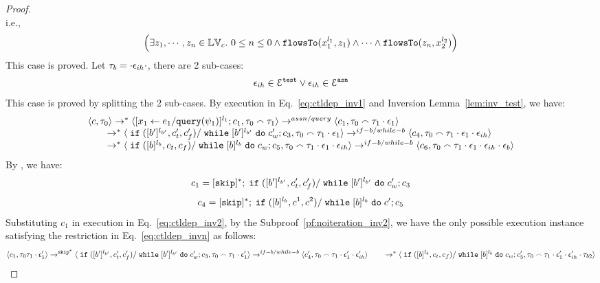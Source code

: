 \begin{proof}
\[ \]
 i.e.,
 \[
 \Big( \exists z_1, \cdots, z_n \in \mathbb{LV}_{{c}}. ~ 0 \leq n \leq 0 \land
  \mathtt{flowsTo}(x_1^{l_1}, z_1) 
  \land \cdots \land \mathtt{flowsTo}(z_n, x_2^{l_2}) \Big)
 \]
 This case is proved.
%
 Let $\mathtt{\tau}_b = \cdot \mathtt{\epsilon}_{ih} \cdot$, there are 2 sub-cases: 
 \[
 \mathtt{\epsilon}_{ih} \in \mathcal{E}^{\mathtt{{test}}} \lor \mathtt{\epsilon}_{ih} \in \mathcal{E}^{\mathtt{{asn}}}
 \]
 This case is proved by splitting the 2 sub-cases.
By execution in Eq.~\ref{eq:ctldep_inv1} and {Inversion Lemma~\ref{lem:inv_test}}, we have:
%
\[
  \begin{array}{l}   
  \langle {c}, \mathtt{\tau}_0 \rangle 
  \rightarrow^{*} 
  \langle [\mathrel{ {x}_1 \leftarrow e_1 / {\tt query}(\psi_1) }]^{l_1} ; {c}_1, \mathtt{\tau}_0 \smallfrown \mathtt{\tau}_1 \rangle  
  \rightarrow^{assn/query}
  \langle c_1, \mathtt{\tau}_0 \smallfrown \mathtt{\tau}_1 \cdot \mathtt{\epsilon}_1 \rangle 
  \\ 
  \qquad \rightarrow^{*} 
  \langle \;\mathtt{if}\;([b']{}^{l_{b'}}, c_t', c_f') / \;\mathtt{while}\; [b']{}^{l_{b'}} \;\mathtt{do}\; c_w'; {c}_3, 
  \mathtt{\tau}_0 \smallfrown \mathtt{\tau}_1 \cdot \mathtt{\epsilon}_1 \rangle 
  \rightarrow^{if-b / while-b} 
  \langle {c}_4,  \mathtt{\tau}_0 \smallfrown \mathtt{\tau}_1 \cdot \mathtt{\epsilon}_1 \cdot \mathtt{\epsilon}_{ih} \rangle 
  \\ 
  \qquad \rightarrow^{*} 
  \langle \;\mathtt{if}\;([b]{}^{l_b}, c_t, c_f) / \;\mathtt{while}\; [b]{}^{l_b} \;\mathtt{do}\; c_w; {c}_5, 
  \mathtt{\tau}_0 \smallfrown \mathtt{\tau}_1 \cdot \mathtt{\epsilon}_1\cdot \mathtt{\epsilon}_{ih} \rangle 
  \rightarrow^{if-b / while-b} 
  \langle {c}_6,  \mathtt{\tau}_0 \smallfrown \mathtt{\tau}_1 \cdot \mathtt{\epsilon}_1 \cdot \mathtt{\epsilon}_{ih} \cdot \mathtt{\epsilon}_b \rangle 
\end{array}
 \]
 By , we have:
 \[
 c_1 = [\mathtt{skip}]^*;\;\mathtt{if}\;([b']{}^{l_{b'}}, c_t', c_f') / \;\mathtt{while}\; [b']{}^{l_{b'}} \;\mathtt{do}\; c_w'; {c}_3
 \]
 \[
 c_4 = [\mathtt{skip}]^*;\;\mathtt{if}\;([b]{}^{l_b}, c^1, c^2) / \;\mathtt{while}\; [b]{}^{l_b} \;\mathtt{do}\; c'; {c}_5
 \]
Substituting $c_1$ in execution in Eq.~\ref{eq:ctldep_inv2}, by the Subproof~\ref{pf:noiteration_inv2}, 
we have the only possible execution instance satisfying 
the restriction in Eq.~\ref{eq:ctldep_invn} as follows:
%
 \[
  \langle c_1, \mathtt{\tau}_0 \mathtt{\tau}_1 \cdot \mathtt{\epsilon}_1' \rangle 
  \rightarrow^{\mathtt{skip}^*} 
  \langle \;\mathtt{if}\;([b']{}^{l_{b'}}, c_t', c_f') / \;\mathtt{while}\; [b']{}^{l_{b'}} \;\mathtt{do}\; c_w'; {c}_3, 
  \mathtt{\tau}_0 \smallfrown \mathtt{\tau}_1 \cdot \mathtt{\epsilon}_1' \rangle 
  \rightarrow^{if-b / while-b} 
  \langle {c}_4',  \mathtt{\tau}_0 \smallfrown \mathtt{\tau}_1 \cdot \mathtt{\epsilon}_1' \cdot \mathtt{\epsilon}_{ih}' \rangle 
  \\ 
  \qquad \rightarrow^{*} 
  \langle \;\mathtt{if}\;([b]{}^{l_b}, c_t, c_f) / \;\mathtt{while}\; [b]{}^{l_b} \;\mathtt{do}\; c_w; {c}_5', 
  \mathtt{\tau}_0 \smallfrown \mathtt{\tau}_1 \cdot \mathtt{\epsilon}_1' \cdot \mathtt{\epsilon}_{ih}' \cdot \mathtt{\tau}_{b2} \rangle 
\]
\end{proof}
